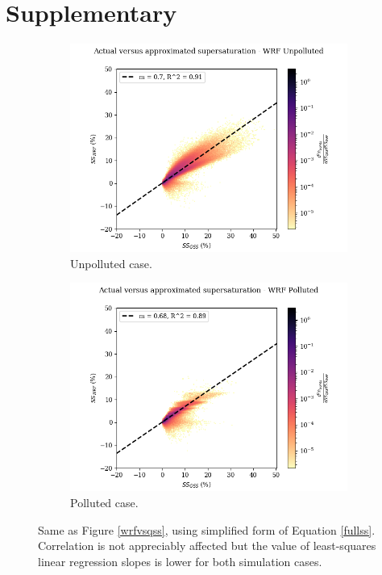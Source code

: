 \documentclass{article}
\begin{document}
\newpage
\clearpage

\section*{Supplementary}

\begin{figure}[ht]
	\centering
	\begin{subfigure}{0.7\textwidth}
		\includegraphics[width=\textwidth]{revmywrf/v11_FINAL_heatmap_ss_qss_vs_ss_wrf_Unpolluted_figure.png}
		\caption{Unpolluted case.}
		\label{wrfvsqssunpollv11}
	\end{subfigure}
	\begin{subfigure}{0.7\textwidth}
		\includegraphics[width=\textwidth]{revmywrf/v11_FINAL_heatmap_ss_qss_vs_ss_wrf_Polluted_figure.png}
		\caption{Polluted case.}
		\label{wrfvsqsspollv11}
	\end{subfigure}
	\caption{Same as Figure \ref{wrfvsqss}, using simplified form of Equation \ref{fullss}. Correlation is not appreciably affected but the value of least-squares linear regression slopes is lower for both simulation cases.}
	\label{wrfvsqssv11}
\end{figure}
\end{document}

